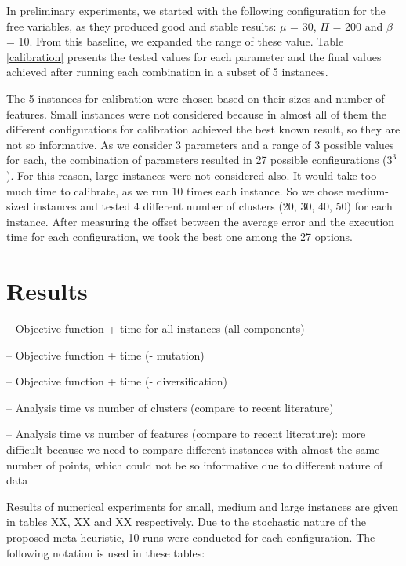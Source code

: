 In preliminary experiments, we started with the following configuration for the free variables, as they produced good and stable results: $\mu$ = 30, $\Pi$ = 200 and $\beta$ = 10. From this baseline, we expanded the range of these value. Table \ref{calibration} presents the tested values for each parameter and the final values achieved after running each combination in a subset of 5 instances.

The 5 instances for calibration were chosen based on their sizes and number of features. Small instances were not considered because in almost all of them the different configurations for calibration achieved the best known result, so they are not so informative. As we consider 3 parameters and a range of 3 possible values for each, the combination of parameters resulted in 27 possible configurations ($3^3$). For this reason, large instances were not considered also. It would take too much time to calibrate, as we run 10 times each instance. So we chose medium-sized instances and tested 4 different number of clusters (20, 30, 40, 50) for each instance. After measuring the offset between the average error and the execution time for each configuration, we took the best one among the 27 options.



\section{Results}

-- Objective function + time for all instances (all components)

-- Objective function + time (- mutation)

-- Objective function + time (- diversification)

-- Analysis time vs number of clusters (compare to recent literature)

-- Analysis time vs number of features (compare to recent literature): more difficult because we need to compare different instances with almost the same number of points, which could not be so informative due to different nature of data

Results of numerical experiments for small, medium and large instances are given in tables XX, XX and XX respectively. Due to the stochastic nature of the proposed meta-heuristic, 10 runs were conducted for each configuration. The following notation is used in these tables:

